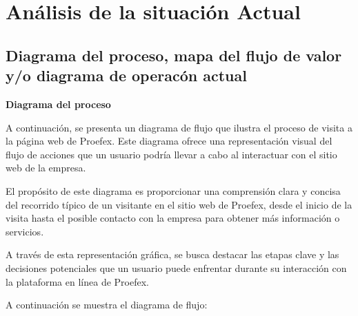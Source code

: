 \titlespacing{\chapter}{0pt}{120pt}{7pt}
\chapter{Análisis de la situación Actual}
\label{cap:metodologia}

\section{Diagrama del proceso, mapa del flujo de valor y/o diagrama de operacón actual}

\textbf{Diagrama del proceso}

A continuación, se presenta un diagrama de flujo que ilustra el proceso de visita a la página web de Proefex. Este diagrama ofrece una representación visual del flujo de acciones que un usuario podría llevar a cabo al interactuar con el sitio web de la empresa.

El propósito de este diagrama es proporcionar una comprensión clara y concisa del recorrido típico de un visitante en el sitio web de Proefex, desde el inicio de la visita hasta el posible contacto con la empresa para obtener más información o servicios.

A través de esta representación gráfica, se busca destacar las etapas clave y las decisiones potenciales que un usuario puede enfrentar durante su interacción con la plataforma en línea de Proefex.

A continuación se muestra el diagrama de flujo:


